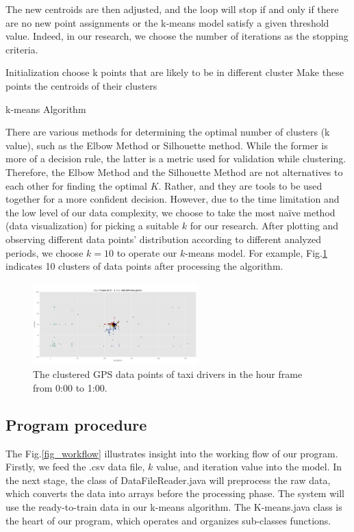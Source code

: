 \documentclass[journal]{IEEEtran}
\begin{document}
The new centroids are then adjusted, and the loop will stop if and only if there are no new point assignments or the k-means model satisfy a given threshold value. Indeed, in our research, we choose the number of iterations as the stopping criteria\cite{rajaraman2011mining}.

\begin{algorithm}[!t]
	\SetAlgoLined
	Initialization choose k points that are likely to be in different cluster\;
	Make these points the centroids of their clusters\;
	\caption{k-means Algorithm}
	\label{algorithm:k-means}
\end{algorithm}

There are various methods for determining the optimal number of clusters (k value), such as the Elbow Method\cite{syakur2018integration} or Silhouette method\cite{perner2017machine}. While the former is more of a decision rule, the latter is a metric used for validation while clustering. Therefore, the Elbow Method and the Silhouette Method are not alternatives to each other for finding the optimal $K$. Rather, and they are tools to be used together for a more confident decision. However, due to the time limitation and the low level of our data complexity, we choose to take the most naïve method (data visualization) for picking a suitable $k$ for our research. After plotting and observing different data points’ distribution according to different analyzed periods, we choose $k=10$ to operate our $k$-means model. For example, Fig.\ref{fig_scatter0} indicates 10 clusters of data points after processing the algorithm.

\begin{figure}[!t]
	\centering
	\includegraphics[width=2.5in]{image/Scatter0.png}
	\caption{The clustered GPS data points of taxi drivers in the hour frame from 0:00 to 1:00.}
	\label{fig_scatter0}
\end{figure}

\subsection{Program procedure}
The Fig.\ref{fig_workflow} illustrates insight into the working flow of our program. Firstly, we feed the .csv data file, $k$ value, and iteration value into the model. In the next stage, the class of DataFileReader.java will preprocess the raw data, which converts the data into arrays before the processing phase. The system will use the ready-to-train data in our k-means algorithm. The K-means.java class is the heart of our program, which operates and organizes sub-classes functions. 
\end{document}
